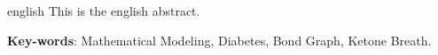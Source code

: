 \begin{resumo}[Abstract]
 \begin{otherlanguage*}{english}
   This is the english abstract.

   \vspace{\onelineskip}
 
   \noindent 
   \textbf{Key-words}: Mathematical Modeling, Diabetes, Bond Graph, Ketone Breath.
 \end{otherlanguage*}
\end{resumo}
